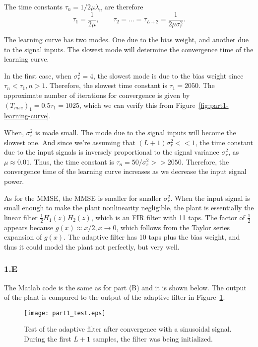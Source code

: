 The time constants $\tau_n = 1/2\mu\lambda_n$ are therefore
\begin{equation}
\tau_1 = \frac{1}{2\mu}, \qquad \tau_2 = \ldots = \tau_{L+2} = \frac{1}{2\mu\sigma_r^2}.
\end{equation}

The learning curve has two modes. One due to the bias weight, and another due to the signal inputs. The slowest mode will determine the convergence time of the learning curve. 

In the first case, when $\sigma_r^2 = 4$, the slowest mode is due to the bias weight since $\tau_n < \tau_1, n > 1$. Therefore, the slowest time constant is $\tau_1 = 2050$. The approximate number of iterations for convergence is given by $(T_{mse})_1 = 0.5\tau_1 = 1025$, which we can verify this from Figure~\ref{fig:part1-learning-curve}.

When, $\sigma_r^2$ is made small. The mode due to the signal inputs will become the slowest one. And since we're assuming that $(L+1)\sigma_r^2 << 1$, the time constant due to the input signals is inversely proportional to the signal variance $\sigma_r^2$, as $\mu\approx 0.01$. Thus, the time constant is $\tau_n = 50/\sigma_r^2 >> 2050$. Therefore, the convergence time of the learning curve increases as we decrease the input signal power.

As for the MMSE, the MMSE is smaller for smaller $\sigma_r^2$. When the input signal is small enough to make the plant nonlinearity negligible, the plant is essentially the linear filter $\frac{1}{2}H_1(z)H_2(z)$, which is an FIR filter with 11 taps. The factor of $\frac{1}{2}$ appears because $g(x) \approx x/2, x \to 0$, which follows from the Taylor series expansion of $g(x)$. The adaptive filter has 10 taps plus the bias weight, and thus it could model the plant not perfectly, but very well. 

\subsubsection*{1.E}
The Matlab code is the same as for part (B) and it is shown below. The output of the plant is compared to the output of the adaptive filter in Figure~\ref{fig:part1-test}.

\FloatBarrier
\begin{figure}[h!]
	\centering
	\texttt{[image: part1\_test.eps]}
	\caption{Test of the adaptive filter after convergence with a sinusoidal signal. During the first $L+1$ samples, the filter was being initialized.}
	\label{fig:part1-test}
\end{figure}
\FloatBarrier
